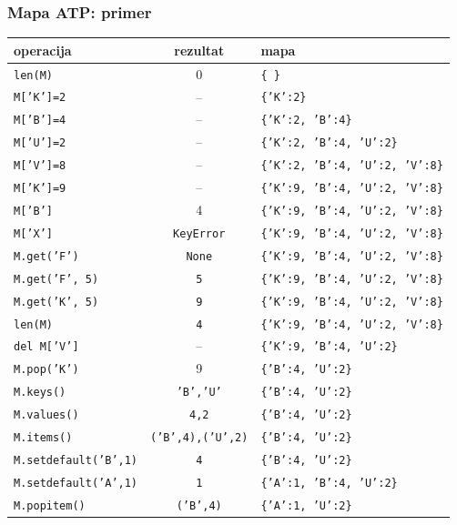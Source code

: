 \documentclass[compress,aspectratio=169]{beamer}
\begin{document}
\begin{frame}
  \frametitle{Mapa ATP: primer}
  \begin{center}
    \begin{tabular}{lcl}
      \textbf{operacija} & \textbf{rezultat} & \textbf{mapa} \\ \hline
      \texttt{len(M)} & 0 & \texttt{\{ \}} \\
      \texttt{M['K']=2} & -- & \texttt{\{'K':2\}} \\
      \texttt{M['B']=4} & -- & \texttt{\{'K':2, 'B':4\}} \\
      \texttt{M['U']=2} & -- & \texttt{\{'K':2, 'B':4, 'U':2\}} \\
      \texttt{M['V']=8} & -- & \texttt{\{'K':2, 'B':4, 'U':2, 'V':8\}} \\
      \texttt{M['K']=9} & -- & \texttt{\{'K':9, 'B':4, 'U':2, 'V':8\}} \\
      \texttt{M['B']} & 4 & \texttt{\{'K':9, 'B':4, 'U':2, 'V':8\}} \\
      \texttt{M['X']} & \texttt{KeyError} & \texttt{\{'K':9, 'B':4, 'U':2, 'V':8\}} \\
      \texttt{M.get('F')} & \texttt{None} & \texttt{\{'K':9, 'B':4, 'U':2, 'V':8\}} \\
      \texttt{M.get('F', 5)} & \texttt{5} & \texttt{\{'K':9, 'B':4, 'U':2, 'V':8\}} \\
      \texttt{M.get('K', 5)} & \texttt{9} & \texttt{\{'K':9, 'B':4, 'U':2, 'V':8\}} \\
      \texttt{len(M)} & \texttt{4} & \texttt{\{'K':9, 'B':4, 'U':2, 'V':8\}} \\
      \texttt{del M['V']} & -- & \texttt{\{'K':9, 'B':4, 'U':2\}} \\
      \texttt{M.pop('K')} & 9 & \texttt{\{'B':4, 'U':2\}} \\
      \texttt{M.keys()} & \texttt{'B','U'} & \texttt{\{'B':4, 'U':2\}} \\
      \texttt{M.values()} & \texttt{4,2} & \texttt{\{'B':4, 'U':2\}} \\
      \texttt{M.items()} & \texttt{('B',4),('U',2)} & \texttt{\{'B':4, 'U':2\}} \\
      \texttt{M.setdefault('B',1)} & \texttt{4} & \texttt{\{'B':4, 'U':2\}} \\
      \texttt{M.setdefault('A',1)} & \texttt{1} & \texttt{\{'A':1, 'B':4, 'U':2\}} \\
      \texttt{M.popitem()} & \texttt{('B',4)} & \texttt{\{'A':1, 'U':2\}}
    \end{tabular}
  \end{center}
\end{frame}
\end{document}
